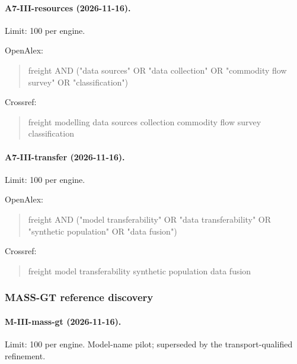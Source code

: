 \paragraph{A7-III-resources (2026-11-16).} Limit: 100 per engine.

\noindent OpenAlex:

\begin{quote}\footnotesize\ttfamily\raggedright

freight AND ("data sources" OR "data collection" OR "commodity flow survey" OR "classification")

\end{quote}

\noindent Crossref:

\begin{quote}\footnotesize\ttfamily\raggedright

freight modelling data sources collection commodity flow survey classification

\end{quote}

\paragraph{A7-III-transfer (2026-11-16).} Limit: 100 per engine.

\noindent OpenAlex:

\begin{quote}\footnotesize\ttfamily\raggedright

freight AND ("model transferability" OR "data transferability" OR "synthetic population" OR "data fusion")

\end{quote}

\noindent Crossref:

\begin{quote}\footnotesize\ttfamily\raggedright

freight model transferability synthetic population data fusion

\end{quote}

\subsubsection{MASS-GT reference discovery}

\paragraph{M-III-mass-gt (2026-11-16).} Limit: 100 per engine. Model-name pilot; superseded by the transport-qualified refinement.

